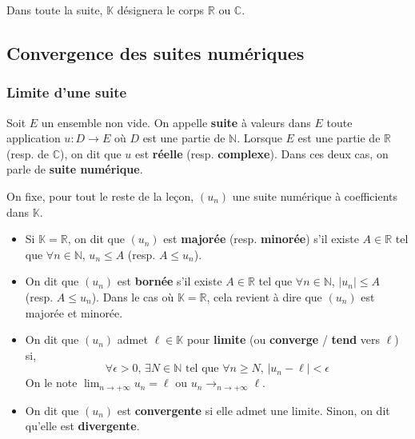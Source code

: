 




  Dans toute la suite, $\mathbb{K}$ désignera le corps $\mathbb{R}$ ou $\mathbb{C}$.

  \subsection{Convergence des suites numériques}

  \subsubsection{Limite d'une suite}


  \begin{definition}
    Soit $E$ un ensemble non vide. On appelle \textbf{suite} à valeurs dans $E$ toute application $u: D \rightarrow E$ où $D$ est une partie de $\mathbb{N}$. Lorsque $E$ est une partie de $\mathbb{R}$ (resp. de $\mathbb{C}$), on dit que $u$ est \textbf{réelle} (resp. \textbf{complexe}). Dans ces deux cas, on parle de \textbf{suite numérique}.
  \end{definition}

  On fixe, pour tout le reste de la leçon, $(u_n)$ une suite numérique à coefficients dans $\mathbb{K}$.


  \begin{definition}
    \label{223-1}
    \begin{itemize}
      \item Si $\mathbb{K} = \mathbb{R}$, on dit que $(u_n)$ est \textbf{majorée} (resp. \textbf{minorée}) s'il existe $A \in \mathbb{R}$ tel que $\forall n \in \mathbb{N}$, $u_n \leq A$ (resp. $A \leq u_n$).
      \item On dit que $(u_n)$ est \textbf{bornée} s'il existe $A \in \mathbb{R}$ tel que $\forall n \in \mathbb{N}$, $\vert u_n \vert \leq A$ (resp. $A \leq u_n$). Dans le cas où $\mathbb{K} = \mathbb{R}$, cela revient à dire que $(u_n)$ est majorée et minorée.
      \item On dit que $(u_n)$ admet $\ell \in \mathbb{K}$ pour \textbf{limite} (ou \textbf{converge} / \textbf{tend} vers $\ell$) si,
      \[ \forall \epsilon > 0, \, \exists N \in \mathbb{N} \text{ tel que } \forall n \geq N, \, \vert u_n - \ell \vert < \epsilon \]
      On le note $\lim_{n \rightarrow +\infty} u_n = \ell$ ou $u_n \longrightarrow_{n \rightarrow +\infty} \ell$.
      \item On dit que $(u_n)$ est \textbf{convergente} si elle admet une limite. Sinon, on dit qu'elle est \textbf{divergente}.
    \end{itemize}
  \end{definition}

